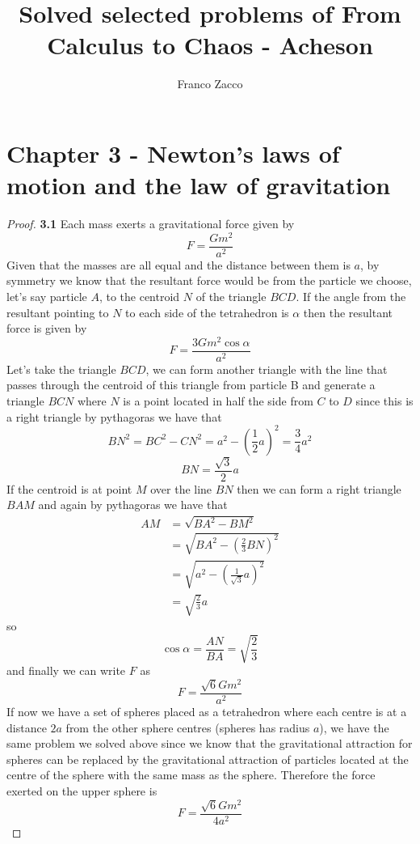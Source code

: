 \documentclass[11pt]{article}
\title{\textbf{Solved selected problems of From Calculus to Chaos - Acheson}}
\author{Franco Zacco}
\date{}
\begin{document}
\maketitle
\thispagestyle{empty}

\section*{Chapter 3 - Newton's laws of motion and the law of gravitation}

	\begin{proof}{\textbf{3.1}}
        Each mass exerts a gravitational force given by
        $$F = \frac{Gm^2}{a^2}$$
        Given that the masses are all equal and the distance between them is
        $a$, by symmetry we know that the resultant force would be from
        the particle we choose, let's say particle $A$, to the centroid $N$ of the 
        triangle $BCD$. If the angle from the resultant pointing to $N$ to each side of
        the tetrahedron is $\alpha$ then the resultant force is given by
        $$F = \frac{3Gm^2\cos{\alpha}}{a^2}$$
        Let's take the triangle $BCD$, we can form another triangle with the
        line that passes through the centroid of this triangle from particle B
        and generate a triangle $BCN$ where $N$ is a point located in half the
        side from $C$ to $D$ since this is a right triangle by pythagoras we
        have that
        $$BN^2 = BC^2 - CN^2 = a^2 - ( \frac{1}{2}a)^2 = \frac{3}{4}a^2$$
        $$BN = \frac{\sqrt{3}}{2}a$$
        If the centroid is at point $M$ over the line $BN$ then we can
        form a right triangle $BAM$ and again by pythagoras we have that
        \begin{align*}
        AM &= \sqrt{BA^2 - BM^2} \\
           &= \sqrt{BA^2 - (\frac{2}{3}BN)^2} \\
           &= \sqrt{a^2 - (\frac{1}{\sqrt{3}}a)^2} \\
           &= \sqrt{\frac{2}{3}}a
        \end{align*}
        so
        $$\cos{\alpha} = \frac{AN}{BA} = \sqrt{\frac{2}{3}}$$
        and finally we can write $F$ as
        $$F = \frac{\sqrt{6}Gm^2}{a^2}$$
        If now we have a set of spheres placed as a tetrahedron where each centre
        is at a distance $2a$ from the other sphere centres (spheres has radius
        $a$), we have the same problem we solved above since we know that the
        gravitational attraction for spheres can be replaced by the
        gravitational attraction of particles located at the centre of the
        sphere with the same mass as the sphere. Therefore the force exerted on
        the upper sphere is
        $$F = \frac{\sqrt{6}Gm^2}{4a^2}$$
    \end{proof}
\end{document}
